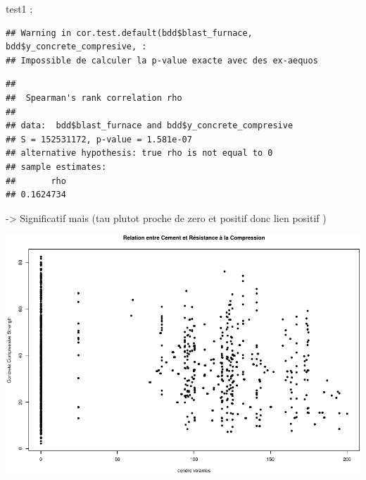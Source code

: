 \documentclass[
  12pt,
]{article}
\newenvironment{Shaded}{\begin{snugshade}}{\end{snugshade}}
\newcommand{\AttributeTok}[1]{\textcolor[rgb]{0.13,0.29,0.53}{#1}}
\newcommand{\FunctionTok}[1]{\textcolor[rgb]{0.13,0.29,0.53}{\textbf{#1}}}
\newcommand{\NormalTok}[1]{#1}
\newcommand{\SpecialCharTok}[1]{\textcolor[rgb]{0.81,0.36,0.00}{\textbf{#1}}}
\newcommand{\StringTok}[1]{\textcolor[rgb]{0.31,0.60,0.02}{#1}}
\begin{document}
test1 ;

\begin{Shaded}
\end{Shaded}

\begin{verbatim}
## Warning in cor.test.default(bdd$blast_furnace, bdd$y_concrete_compresive, :
## Impossible de calculer la p-value exacte avec des ex-aequos
\end{verbatim}

\begin{verbatim}
## 
##  Spearman's rank correlation rho
## 
## data:  bdd$blast_furnace and bdd$y_concrete_compresive
## S = 152531172, p-value = 1.581e-07
## alternative hypothesis: true rho is not equal to 0
## sample estimates:
##       rho 
## 0.1624734
\end{verbatim}

-\textgreater{} Significatif mais (tau plutot proche de zero et positif
donc lien positif )

\begin{center}\includegraphics{rmd_final_files/figure-latex/unnamed-chunk-7-1} \end{center}

\begin{Shaded}
\end{Shaded}
\end{document}
